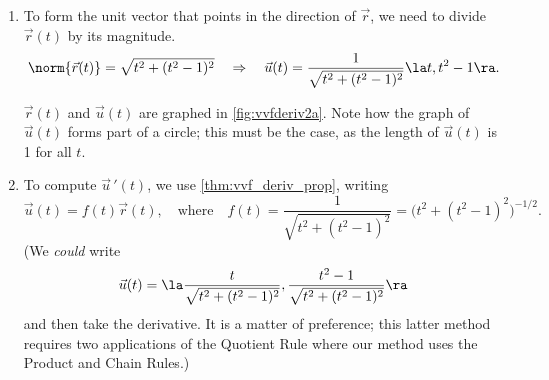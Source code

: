 {\begin{enumerate}
	\item To form the unit vector that points in the direction of $\vec r$, we need to divide $\vec r(t)$ by its magnitude. 
	$$\norm{\vec r(t)} = \sqrt{t^2+(t^2-1)^2} \quad \Rightarrow \quad \vec u(t) = \frac{1}{\sqrt{t^2+(t^2-1)^2}}\la t,t^2-1\ra.$$
	
	$\vec r(t)$ and $\vec u(t)$ are graphed in \autoref{fig:vvfderiv2a}. Note how the graph of $\vec u(t)$ forms part of a circle; this must be the case, as the length of $\vec u(t)$ is 1 for all $t$.
	
	\item		To compute $\vec u\,'(t)$, we use \autoref{thm:vvf_deriv_prop}, writing $$\vec u(t) = f(t)\vec r(t),\quad  \text{where}\quad f(t) = \frac{1}{\sqrt{t^2+(t^2-1)^2}}=\big(t^2+(t^2-1)^2\big)^{-1/2}.$$ (We \emph{could} write $$\vec u(t) = \la \frac{t}{\sqrt{t^2+(t^2-1)^2}}, \frac{t^2-1}{\sqrt{t^2+(t^2-1)^2}}\ra$$ and then take the derivative. It is a matter of preference; this latter method requires two applications of the Quotient Rule where our method uses the Product and Chain Rules.)
	

\end{enumerate}}
